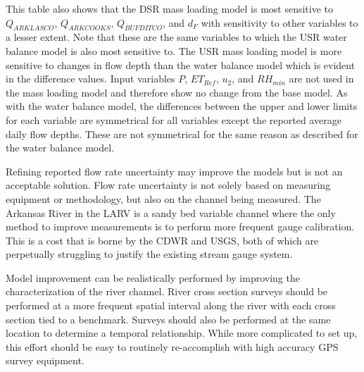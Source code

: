 This table also shows that the DSR mass loading model is most sensitive to $ Q_{ARKLASCO} $, $ Q_{ARKCOOKS} $, $ Q_{BUFDITCO} $, and $ d_F $ with sensitivity to other variables to a lesser extent.  Note that these are the same variables to which the USR water balance model is also most sensitive to.  The USR mass loading model is more sensitive to changes in flow depth than the water balance model which is evident in the difference values.  Input variables $ P $, $ ET_{Ref} $, $ u_2 $, and $ RH_{min} $ are not used in the mass loading model and therefore show no change from the base model.  As with the water balance model, the differences between the upper and lower limits for each variable are symmetrical for all variables except the reported average daily flow depths.  These are not symmetrical for the same reason as described for the water balance model.

Refining reported flow rate uncertainty may improve the models but is not an acceptable solution.  Flow rate uncertainty is not solely based on measuring equipment or methodology, but also on the channel being measured.  The Arkansas River in the LARV is a sandy bed variable channel where the only method to improve measurements is to perform more frequent gauge calibration.  This is a cost that is borne by the CDWR and USGS, both of which are perpetually struggling to justify the existing stream gauge system.

Model improvement can be realistically performed by improving the characterization of the river channel.  River cross section surveys should be performed at a more frequent spatial interval along the river with each cross section tied to a benchmark.  Surveys should also be performed at the same location to determine a temporal relationship.  While more complicated to set up, this effort should be easy to routinely re-accomplish with high accuracy GPS survey equipment.

\clearpage{}